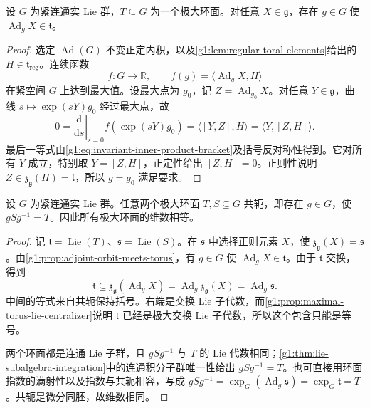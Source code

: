 \begin{proposition}\label{g1:prop:adjoint-orbit-meets-torus}
	设 \(G\) 为紧连通实 Lie 群，\(T\subseteq G\) 为一个极大环面。对任意 \(X\in\mathfrak g\)，存在 \(g\in G\) 使 \(\operatorname{Ad}_gX\in\mathfrak t\)。
\end{proposition}
\begin{proof}
	选定 \(\operatorname{Ad}(G)\) 不变正定内积，以及\cref{g1:lem:regular-toral-elements}给出的 \(H\in\mathfrak t_{\mathrm{reg}}\)。连续函数
	\[
		f:G\to\mathbb R,\qquad f(g)=\langle\operatorname{Ad}_gX,H\rangle
	\]
	在紧空间 \(G\) 上达到最大值。设最大点为 \(g_0\)，记 \(Z=\operatorname{Ad}_{g_0}X\)。对任意 \(Y\in\mathfrak g\)，曲线 \(s\mapsto\exp(sY)g_0\) 经过最大点，故
	\[
		0=\left.\frac{\mathrm{d}}{\mathrm{d}s}\right|_{s=0}
		f(\exp(sY)g_0)
		=\langle[Y,Z],H\rangle
		=\langle Y,[Z,H]\rangle.
	\]
	最后一等式由\eqref{g1:eq:invariant-inner-product-bracket}及括号反对称性得到。它对所有 \(Y\) 成立，特别取 \(Y=[Z,H]\)，正定性给出 \([Z,H]=0\)。正则性说明 \(Z\in\mathfrak z_{\mathfrak g}(H)=\mathfrak t\)，所以 \(g=g_0\) 满足要求。
\end{proof}

\begin{theorem}[极大环面的共轭定理]\label{g1:thm:maximal-tori-conjugate}
	设 \(G\) 为紧连通实 Lie 群。任意两个极大环面 \(T,S\subseteq G\) 共轭，即存在 \(g\in G\)，使 \(gSg^{-1}=T\)。因此所有极大环面的维数相等。
\end{theorem}
\begin{proof}
	记 \(\mathfrak t=\operatorname{Lie}(T)\)、\(\mathfrak s=\operatorname{Lie}(S)\)。在 \(\mathfrak s\) 中选择正则元素 \(X\)，使 \(\mathfrak z_{\mathfrak g}(X)=\mathfrak s\)。由\cref{g1:prop:adjoint-orbit-meets-torus}，有 \(g\in G\) 使 \(\operatorname{Ad}_gX\in\mathfrak t\)。由于 \(\mathfrak t\) 交换，得到
	\[
		\mathfrak t\subseteq\mathfrak z_{\mathfrak g}(\operatorname{Ad}_gX)
		=\operatorname{Ad}_g\mathfrak z_{\mathfrak g}(X)
		=\operatorname{Ad}_g\mathfrak s.
	\]
	中间的等式来自共轭保持括号。右端是交换 Lie 子代数，而\cref{g1:prop:maximal-torus-lie-centralizer}说明 \(\mathfrak t\) 已经是极大交换 Lie 子代数，所以这个包含只能是等号。

	两个环面都是连通 Lie 子群，且 \(gSg^{-1}\) 与 \(T\) 的 Lie 代数相同；\cref{g1:thm:lie-subalgebra-integration}中的连通积分子群唯一性给出 \(gSg^{-1}=T\)。也可直接用环面指数的满射性以及指数与共轭相容，写成 \(gSg^{-1}=\exp_G(\operatorname{Ad}_g\mathfrak s)=\exp_G\mathfrak t=T\)。共轭是微分同胚，故维数相同。
\end{proof}

